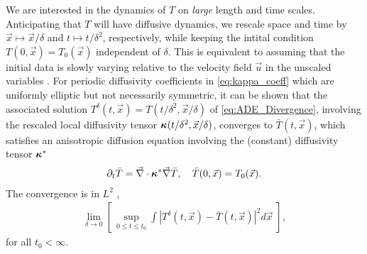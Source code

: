 \documentclass[11pt]{amsart}
\newcommand\bkappa{\mbox{\boldmath${\kappa}$}}
\begin{document}
We are interested in the dynamics of $T$ on \emph{large} length and
time scales. Anticipating that $T$ will have diffusive dynamics, we
rescale space and time by $\vec{x}\mapsto\vec{x}/\delta$ and $t\mapsto t/\delta^2$,
respectively, while keeping the intital condition
$T(0,\vec{x})=T_0(\vec{x})$ independent 
of $\delta$. This is equivalent to assuming that the initial data is slowly
varying relative to the velocity field $\vec{u}$ in the unscaled
variables
\cite{McLaughlin:SIAM_JAM:780,Fannjiang:SIAM_JAM:333,Fannjiang:1997:1033}. 
For periodic diffusivity coefficients in \eqref{eq:kappa_coeff} which
are uniformly elliptic but not necessarily symmetric, it can be shown 
\cite{Fannjiang:SIAM_JAM:333} that the associated solution
$T^\delta(t,\vec{x})=T(t/\delta^2,\vec{x}/\delta)$  of \eqref{eq:ADE_Divergence},
involving the rescaled local diffusivity tensor
$\bkappa(t/\delta^2,\vec{x}/\delta)$, converges to $\bar{T}(t,\vec{x})$, which
satisfies an anisotropic diffusion equation involving the (constant)
diffusivity tensor $\bkappa^*$
%
\begin{align}
  \partial_t\bar{T}=\vec{\nabla}\cdot\bkappa^*\vec{\nabla}\bar{T}, \quad
  \bar{T}(0,\vec{x})=T_0(\vec{x}).
\end{align}
%
The convergence is in $L^2$ \cite{Fannjiang:SIAM_JAM:333},
%
\begin{align}
  \lim_{\delta\to0}\left[\,\sup_{0\leq t\leq t_0}
    \int\left|T^\delta(t,\vec{x})-\bar{T}(t,\vec{x})\right|^2d\vec{x}
    \;\right],
\end{align}
%
for all $t_0<\infty$.
\end{document}
